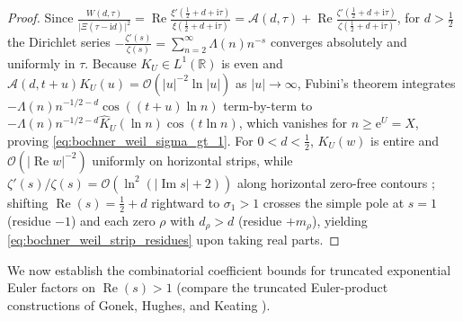 \documentclass[11pt,reqno]{amsart}
\theoremstyle{definition}
\theoremstyle{remark}
\numberwithin{equation}{section}
\newcommand{\ii}{\mathrm{i}}
\newcommand{\ee}{\mathrm{e}}
\newcommand{\Rea}{\operatorname{Re}}
\newcommand{\Ima}{\operatorname{Im}}
\begin{document}
\begin{proof}
Since $\frac{W(d,\tau)}{\lvert\Xi(\tau-\ii d)\rvert^2} = \Rea\frac{\xi'(\frac{1}{2}+d+\ii\tau)}{\xi(\frac{1}{2}+d+\ii\tau)} = \mathcal{A}(d,\tau) + \Rea\frac{\zeta'(\frac{1}{2}+d+\ii\tau)}{\zeta(\frac{1}{2}+d+\ii\tau)}$, for $d > \frac{1}{2}$ the Dirichlet series $-\frac{\zeta'(s)}{\zeta(s)} = \sum_{n=2}^\infty \Lambda(n)n^{-s}$ converges absolutely and uniformly in $\tau$. Because $K_U \in L^1(\mathbb{R})$ is even and $\mathcal{A}(d,t+u)K_U(u) = \mathcal{O}(\lvert u\rvert^{-2}\ln\lvert u\rvert)$ as $\lvert u\rvert \to \infty$, Fubini's theorem integrates $-\Lambda(n)n^{-1/2-d}\cos((t+u)\ln n)$ term-by-term to $-\Lambda(n)n^{-1/2-d}\widehat{K}_U(\ln n)\cos(t\ln n)$, which vanishes for $n \ge \ee^U = X$, proving \eqref{eq:bochner_weil_sigma_gt_1}. For $0 < d < \frac{1}{2}$, $K_U(w)$ is entire and $\mathcal{O}(\lvert\Rea w\rvert^{-2})$ uniformly on horizontal strips, while $\zeta'(s)/\zeta(s) = \mathcal{O}(\ln^2(\lvert\Ima s\rvert+2))$ along horizontal zero-free contours \cite[Section~9.6]{Titchmarsh1986}; shifting $\Rea(s) = \frac{1}{2}+d$ rightward to $\sigma_1 > 1$ crosses the simple pole at $s = 1$ (residue $-1$) and each zero $\rho$ with $d_\rho > d$ (residue $+m_\rho$), yielding \eqref{eq:bochner_weil_strip_residues} upon taking real parts.
\end{proof}

We now establish the combinatorial coefficient bounds for truncated exponential Euler factors on $\Rea(s) > 1$ (compare the truncated Euler-product constructions of Gonek, Hughes, and Keating \cite{GonekHughesKeating2007}).
\end{document}
